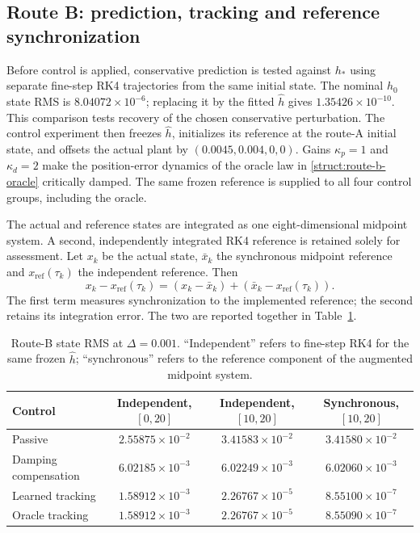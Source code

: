 \subsection{Route B: prediction, tracking and reference synchronization}
\label{num:route-b}
Before control is applied, conservative prediction is tested against
$h_*$ using separate fine-step RK4 trajectories from the same initial
state. The nominal $h_0$ state RMS is $8.04072\times10^{-6}$; replacing
it by the fitted $\widehat h$ gives $1.35426\times10^{-10}$.
This comparison tests recovery of the chosen conservative perturbation.
The control experiment then freezes $\widehat h$, initializes its
reference at the route-A initial state, and offsets the actual plant
by $(0.0045,0.004,0,0)$. Gains $\kappa_p=1$ and $\kappa_d=2$ make the
position-error dynamics of the oracle law in
\eqref{struct:route-b-oracle} critically damped. The same frozen reference is supplied
to all four control groups, including the oracle.

The actual and reference states are integrated as one eight-dimensional
midpoint system. A second, independently integrated RK4 reference is
retained solely for assessment. Let $x_k$ be the actual state,
$\bar x_k$ the synchronous midpoint reference and
$x_{\mathrm{ref}}(\tau_k)$ the independent reference. Then
\begin{equation}
 x_k-x_{\mathrm{ref}}(\tau_k)
 =(x_k-\bar x_k)+
   (\bar x_k-x_{\mathrm{ref}}(\tau_k)).
 \label{num:reference-split}
\end{equation}
The first term measures synchronization to the implemented reference;
the second retains its integration error. The two are reported
together in Table~\ref{num:b-table}.

\begin{table}[t]
\centering
\caption{Route-B state RMS at $\Delta=0.001$. ``Independent'' refers
to fine-step RK4 for the same frozen $\widehat h$; ``synchronous''
refers to the reference component of the augmented midpoint system.}
\label{num:b-table}
\begin{tabular}{lccc}
\toprule
Control & Independent, $[0,20]$ & Independent, $[10,20]$ & Synchronous, $[10,20]$\\
\midrule
Passive & $2.55875\times10^{-2}$ & $3.41583\times10^{-2}$ & $3.41580\times10^{-2}$ \\
Damping compensation & $6.02185\times10^{-3}$ & $6.02249\times10^{-3}$ & $6.02060\times10^{-3}$ \\
Learned tracking & $1.58912\times10^{-3}$ & $2.26767\times10^{-5}$ & $8.55100\times10^{-7}$ \\
Oracle tracking & $1.58912\times10^{-3}$ & $2.26767\times10^{-5}$ & $8.55090\times10^{-7}$ \\
\bottomrule
\end{tabular}
\end{table}

